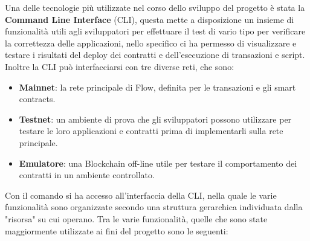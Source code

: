 Una delle tecnologie più utilizzate nel corso dello sviluppo del progetto è stata la \textbf{Command Line Interface} (CLI), questa mette a disposizione un insieme di funzionalità utili agli sviluppatori per effettuare il test di vario tipo per verificare la correttezza delle applicazioni, nello specifico ci ha permesso di visualizzare e testare i risultati del deploy dei contratti e dell'esecuzione di transazioni e script. Inoltre la CLI può interfacciarsi con tre diverse reti, che sono:
\begin{itemize}
	\item \textbf{Mainnet}: la rete principale di Flow, definita per le transazioni e gli smart contracts.
	\item \textbf{Testnet}: un ambiente di prova che gli sviluppatori possono utilizzare per testare le loro applicazioni e contratti prima di implementarli sulla rete principale.
	\item \textbf{Emulatore}: una Blockchain off-line utile per testare il comportamento dei contratti in un ambiente controllato.
\end{itemize}
Con il comando  si ha accesso all'interfaccia della CLI, nella quale le varie funzionalità sono organizzate secondo una struttura gerarchica individuata dalla "risorsa" su cui operano. Tra le varie funzionalità, quelle che sono state maggiormente utilizzate ai fini del progetto sono le seguenti:
